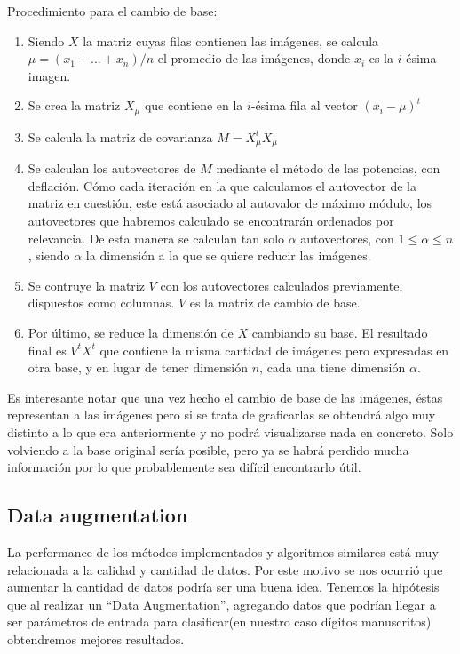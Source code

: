 \bigskip

Procedimiento para el cambio de base:

\begin{enumerate}
\item Siendo $X$ la matriz cuyas filas contienen las imágenes, se calcula $\mu = (x_1 + ... + x_n)/n$ el promedio de las imágenes, donde $x_i$ es la $i$-ésima imagen.
\item Se crea la matriz $X_\mu$ que contiene en la $i$-ésima fila al vector $(x_i - \mu)^t$
\item Se calcula la matriz de covarianza $M = X_\mu^tX_\mu$
\item Se calculan los autovectores de $M$ mediante el método de las potencias, con deflación. Cómo cada iteración en la que calculamos el autovector de la matriz en cuestión, este está asociado al autovalor de máximo módulo, los autovectores que habremos calculado se encontrarán ordenados por relevancia. De esta manera se calculan tan solo $\alpha$ autovectores, con $1 \leq \alpha \leq n$, siendo $\alpha$ la dimensión a la que se quiere reducir las imágenes. 
\item Se contruye la matriz $V$ con los autovectores calculados previamente, dispuestos como columnas. $V$ es la matriz de cambio de base.
\item Por último, se reduce la dimensión de $X$ cambiando su base. El resultado final es $V^tX^t$ que contiene la misma cantidad de imágenes pero expresadas en otra base, y en lugar de tener dimensión $n$, cada una tiene dimensión $\alpha$.
\end{enumerate}\tabularnewline

Es interesante notar que una vez hecho el cambio de base de las imágenes, éstas representan a las imágenes pero si se trata de graficarlas se obtendrá algo muy distinto a lo que era anteriormente y no podrá visualizarse nada en concreto. Solo volviendo a la base original sería posible, pero ya se habrá perdido mucha información por lo que probablemente sea difícil encontrarlo útil.

\subsection{Data augmentation}

La performance de los métodos implementados y algoritmos similares está muy relacionada a la calidad y cantidad de datos. Por este motivo se nos ocurrió que aumentar la cantidad de datos podría ser una buena idea. Tenemos la hipótesis que al realizar un “Data Augmentation”, agregando datos que podrían llegar a ser parámetros de entrada para clasificar(en nuestro caso dígitos manuscritos) obtendremos mejores resultados.


